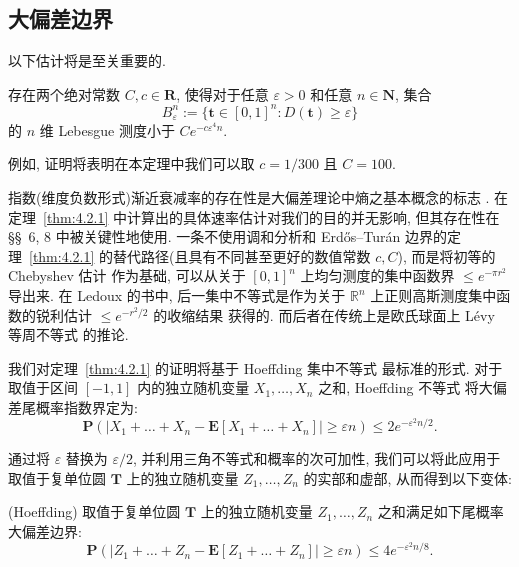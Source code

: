 \subsection{大偏差边界}\label{sec:4.2}

以下估计将是至关重要的.

\begin{theorem}\label{thm:4.2.1}
存在两个绝对常数 $C, c \in \mathbf{R}$, 使得对于任意 $\varepsilon > 0$ 和任意 $n \in \mathbf{N}$, 集合
\[ B_{\varepsilon}^n := \{ \mathbf{t} \in [0,1]^n : D(\mathbf{t}) \ge \varepsilon \} \]
的 $n$ 维 Lebesgue 测度小于 $Ce^{-c\varepsilon^4 n}$.
\end{theorem}

例如, 证明将表明在本定理中我们可以取 $c=1/300$ 且 $C=100$.

\begin{remark}\label{rem:4.2.2}
指数(维度负数形式)渐近衰减率的存在性是大偏差理论中熵之基本概念的标志 \cite{Ell06}.
在定理~\ref{thm:4.2.1} 中计算出的具体速率估计对我们的目的并无影响, 但其存在性在 \S\S~6, 8 中被关键性地使用.
一条不使用调和分析和 Erd\H{o}s--Tur{\'a}n 边界的定理~\ref{thm:4.2.1} 的替代路径(且具有不同甚至更好的数值常数 $c, C$), 而是将初等的 Chebyshev 估计 \cite[Lemma 12]{Wir71} 作为基础, 可以从关于 $[0,1]^n$ 上均匀测度的集中函数界 $\leq e^{-\pi r^2}$ \cite[Prop. 2.8]{Led01} 导出来.
在 Ledoux 的书中, 后一集中不等式是作为关于 $\mathbb{R}^n$ 上正则高斯测度集中函数的锐利估计 $\leq e^{-r^2/2}$ 的收缩结果 \cite[Cor. 2.6]{Led01} 获得的.
而后者在传统上是欧氏球面上 L{\'e}vy 等周不等式 \cite[Theorem 2.3]{Led01} 的推论.
\end{remark}

我们对定理~\ref{thm:4.2.1} 的证明将基于 Hoeffding 集中不等式 \cite{Hoe63} 最标准的形式.
对于取值于区间 $[-1, 1]$ 内的独立随机变量 $X_1, \ldots, X_n$ 之和, Hoeffding 不等式 \cite[Theorem 2.8]{BLM13} 将大偏差尾概率指数界定为:
\begin{equation}\label{eq:4.2.3}
\mathbf{P}\left(\left|X_1 + \ldots + X_n - \mathbf{E}[X_1 + \ldots + X_n]\right| \ge \varepsilon n\right) \le 2e^{-\varepsilon^2 n/2}.
\end{equation}

通过将 $\varepsilon$ 替换为 $\varepsilon/2$, 并利用三角不等式和概率的次可加性, 我们可以将此应用于取值于复单位圆 $\mathbf{T}$ 上的独立随机变量 $Z_1, \ldots, Z_n$ 的实部和虚部, 从而得到以下变体:

\begin{lemma}\label{lem:4.2.4} (Hoeffding)
取值于复单位圆 $\mathbf{T}$ 上的独立随机变量 $Z_1, \ldots, Z_n$ 之和满足如下尾概率大偏差边界:
\begin{equation}\label{eq:4.2.5}
\mathbf{P}\left(\left|Z_1 + \ldots + Z_n - \mathbf{E}[Z_1 + \ldots + Z_n]\right| \ge \varepsilon n\right) \le 4e^{-\varepsilon^2 n/8}.
\end{equation}
\end{lemma}

